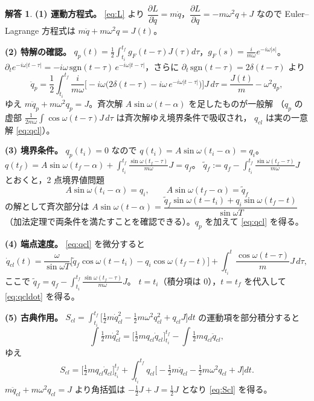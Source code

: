 \documentclass[dvipdfmx, uplatex]{jsarticle}
\theoremstyle{definition}
\newtheorem*{sol}{解答}
\begin{document}
\begin{sol}
\textbf{(1) 運動方程式。}
\eqref{eq:L} より $\dfrac{\partial L}{\partial\dot q}=m\dot q$，$\dfrac{\partial L}{\partial q}=-m\omega^2q+J$ なので
Euler--Lagrange 方程式は $m\ddot q+m\omega^2 q=J(t)$。

\par\smallskip
\textbf{(2) 特解の確認。}
$q_p(t)=\frac12\int_{t_i}^{t_f}g_F(t-\tau)J(\tau)d\tau$，$g_F(s)=\frac{i}{m\omega}e^{-i\omega|s|}$。
$\partial_t e^{-i\omega|t-\tau|}=-i\omega\,\mathrm{sgn}(t-\tau)\,e^{-i\omega|t-\tau|}$，さらに
$\partial_t\,\mathrm{sgn}(t-\tau)=2\delta(t-\tau)$ より
\[
    \ddot q_p=\frac12\!\int_{t_i}^{t_f}\!\frac{i}{m\omega}
    \bigl[-i\omega\bigl(2\delta(t-\tau)-i\omega\,e^{-i\omega|t-\tau|}\bigr)\bigr]J\,d\tau
    =\frac{J(t)}{m}-\omega^2 q_p,
\]
ゆえ $m\ddot q_p+m\omega^2 q_p=J$。斉次解 $A\sin\omega(t-\alpha)$ を足したものが一般解
（$q_p$ の虚部 $\frac1{2m\omega}\!\int\cos\omega(t-\tau)J\,d\tau$ は斉次解ゆえ境界条件で吸収され，
$q_{cl}$ は実の一意解 \eqref{eq:qcl}）。

\par\smallskip
\textbf{(3) 境界条件。}
$q_p(t_i)=0$ なので $q(t_i)=A\sin\omega(t_i-\alpha)=q_i$。
$q(t_f)=A\sin\omega(t_f-\alpha)+\int_{t_i}^{t_f}\frac{\sin\omega(t_f-\tau)}{m\omega}J=q_f$。
$\tilde q_f:=q_f-\int_{t_i}^{t_f}\frac{\sin\omega(t_f-\tau)}{m\omega}J$ とおくと，2 点境界値問題
\[
    A\sin\omega(t_i-\alpha)=q_i,\qquad A\sin\omega(t_f-\alpha)=\tilde q_f
\]
の解として斉次部分は
$A\sin\omega(t-\alpha)=\dfrac{\tilde q_f\sin\omega(t-t_i)+q_i\sin\omega(t_f-t)}{\sin\omega T}$
（加法定理で両条件を満たすことを確認できる）。$q_p$ を加えて \eqref{eq:qcl} を得る。

\par\smallskip
\textbf{(4) 端点速度。}
\eqref{eq:qcl} を微分すると
\[
    \dot q_{cl}(t)
    =\frac{\omega}{\sin\omega T}\Big[\tilde q_f\cos\omega(t-t_i)-q_i\cos\omega(t_f-t)\Big]
    +\int_{t_i}^t\frac{\cos\omega(t-\tau)}{m}J\,d\tau,
\]
ここで $\tilde q_f=q_f-\int_{t_i}^{t_f}\frac{\sin\omega(t_f-\tau)}{m\omega}J$。
$t=t_i$（積分項は 0），$t=t_f$ を代入して \eqref{eq:qcldot} を得る。

\par\smallskip
\textbf{(5) 古典作用。}
$S_{cl}=\int_{t_i}^{t_f}\big[\frac12 m\dot q_{cl}^2-\frac12 m\omega^2 q_{cl}^2+q_{cl}J\big]dt$ の運動項を部分積分すると
\[
    \int\tfrac12 m\dot q_{cl}^2
    =\Big[\tfrac12 m q_{cl}\dot q_{cl}\Big]_{t_i}^{t_f}-\int\tfrac12 m q_{cl}\ddot q_{cl},
\]
ゆえ
\[
    S_{cl}=\Big[\tfrac12 m q_{cl}\dot q_{cl}\Big]_{t_i}^{t_f}
    +\int_{t_i}^{t_f} q_{cl}\Big[-\tfrac12 m\ddot q_{cl}-\tfrac12 m\omega^2 q_{cl}+J\Big]dt.
\]
$m\ddot q_{cl}+m\omega^2 q_{cl}=J$ より角括弧は $-\frac12 J+J=\frac12 J$ となり \eqref{eq:Scl} を得る。
\end{sol}
\end{document}
